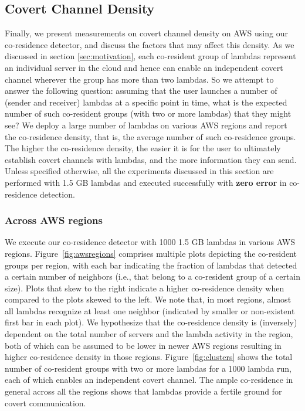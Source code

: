 \subsection{Covert Channel Density}
Finally, we present measurements on covert channel density on AWS using our
co-residence detector, and discuss the factors that may affect this density.  As
we discussed in section \ref{sec:motivation}, each co-resident group of lambdas 
represent an individual server in the cloud and hence can enable an independent 
covert channel wherever the group has more than two lambdas. So we attempt to answer 
the following question: assuming that the user launches a number of
(sender and receiver) lambdas at a specific point in time, what is the expected
number of such co-resident groups (with two or more lambdas) that they might see? 
We deploy a large number of lambdas on various AWS regions and report the co-residence 
density, that is, the average number of such co-residence groups. The higher the 
co-residence density, the easier it is for the user
to ultimately establish covert channels with lambdas, and the more information
they can send. Unless specified otherwise, all the experiments discussed in this
section are performed with 1.5 GB lambdas and executed successfully with
\textbf{zero error} in co-residence detection.



\subsubsection{Across AWS regions}  
We execute our co-residence detector with 1000 1.5 GB lambdas in various AWS
regions. Figure~\ref{fig:awsregions} comprises multiple plots depicting the
co-resident groups per region, with each bar indicating the fraction of lambdas
that detected a certain number of neighbors (i.e., that belong to a co-resident
group of a certain size). Plots that skew to the right indicate a higher
co-residence density when compared to the plots skewed to the left.  We note
that, in most regions, almost all lambdas recognize at least one neighbor
(indicated by smaller or non-existent first bar in each plot). We hypothesize
that the co-residence density is (inversely) dependent on the total number of
servers and the lambda activity in the region, both of which can be assumed to
be lower in newer AWS regions resulting in higher co-residence density in those
regions. Figure~\ref{fig:clusters} shows the total number of co-resident groups
with two or more lambdas for a 1000 lambda run, each of which enables an 
independent covert channel.
The ample co-residence in general across all the regions shows that lambdas
provide a fertile ground for covert communication.


